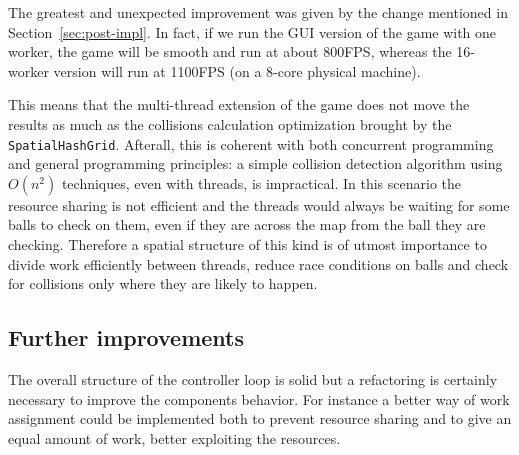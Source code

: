 \documentclass{scrartcl}
\begin{document}
The greatest and unexpected improvement was given by the change mentioned in Section~\ref{sec:post-impl}.
In fact, if we run the GUI version of the game with one worker, the game will be smooth and run at about 
800FPS, whereas the 16-worker version will run at 1100FPS (on a 8-core physical machine).

This means that the multi-thread extension of the game does not move the results as much as the collisions
calculation optimization brought by the \texttt{SpatialHashGrid}. 
Afterall, this is coherent with both concurrent programming and general programming principles: a simple collision detection algorithm
using $O(n^2)$ techniques, even with threads, is impractical. 
In this scenario the resource sharing is not efficient and the threads would always be waiting for some balls to check
on them, even if they are across the map from the ball they are checking.
Therefore a spatial structure of this kind is of utmost importance to divide work efficiently between threads, reduce
race conditions on balls and check for collisions only where they are likely to happen. 

\subsection{Further improvements}
The overall structure of the controller loop is solid but a refactoring is certainly necessary
to improve the components behavior. For instance a better way of work assignment could be implemented
both to prevent resource sharing and to give an equal amount of work, better exploiting the resources. 
\end{document}
